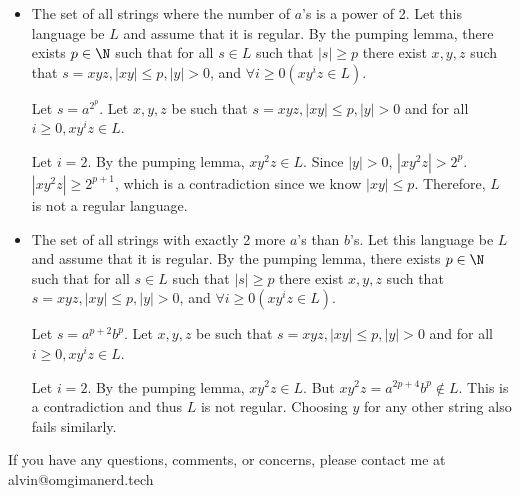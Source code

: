 \documentclass{math}
\begin{document}
\begin{itemize}
  \item The set of all strings where the number of \( a \)'s is a power of 2.
  Let this language be \( L \) and assume that it is regular. By the pumping
  lemma, there exists \( p\in\N \) such that for all \( s\in L \) such that
  \( |s|\ge p \) there exist \( x,y,z \) such that \( s = xyz, |xy|\le p, |y|>0
  \), and \( \forall{i}\ge0(xy^iz\in L) \). \par
  Let \( s = a^{2^p} \). Let \( x,y,z \) be such that
  \( s = xyz, |xy|\le p, |y|>0 \) and for all \( i\ge0, xy^iz\in L \). \par
  Let \( i = 2 \). By the pumping lemma, \( xy^2z\in L \). Since \( |y|>0 \),
  \( |xy^2z|>2^p \). \( |xy^2z|\ge 2^{p+1} \), which is a contradiction since
  we know \( |xy|\le p \). Therefore, \( L \) is not a regular language.

  \item The set of all strings with exactly 2 more \( a \)'s than \( b \)'s.
  Let this language be \( L \) and assume that it is regular. By the pumping
  lemma, there exists \( p\in\N \) such that for all \( s\in L \) such that
  \( |s|\ge p \) there exist \( x,y,z \) such that \( s = xyz, |xy|\le p, |y|>0
  \), and \( \forall{i}\ge0(xy^iz\in L) \). \par
  Let \( s = a^{p+2}b^{p} \). Let \( x,y,z \) be such that
  \( s = xyz, |xy|\le p, |y|>0 \) and for all \( i\ge0, xy^iz\in L \). \par
  Let \( i = 2 \). By the pumping lemma, \( xy^2z\in L \). But \( xy^2z =
  a^{2p+4}b^{p} \notin L\). This is a contradiction and thus \( L \) is not
  regular. Choosing \( y \) for any other string also fails similarly.
\end{itemize}

\begin{center}
  If you have any questions, comments, or concerns, please contact me at
  alvin@omgimanerd.tech
\end{center}
\end{document}
